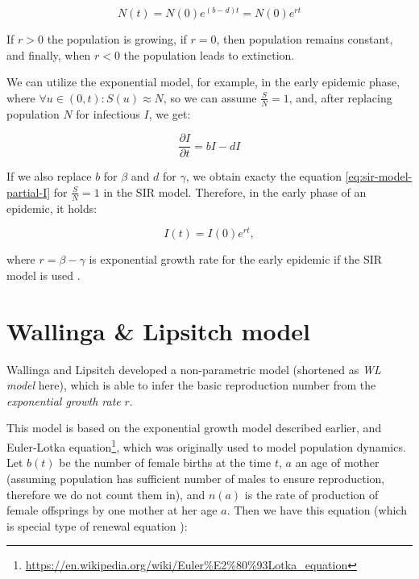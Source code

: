 \documentclass[
  digital, %
  oneside, %
  lof,     %
  lot,     %
]{fithesis4}
\begin{document}
\begin{equation}
  N(t) = N(0) e^{(b - d)t} = N(0) e^{rt}
\end{equation}

If $r > 0$ the population is growing, if $r = 0$, then population remains constant, and finally, when $r < 0$ the population leads to extinction.

We can utilize the exponential model, for example, in the early epidemic phase, where $\forall u \in (0, t) : S(u) \approx N$, so we can assume $\frac{S}{N} = 1$, and, after replacing population $N$ for infectious $I$, we get:

\begin{equation}
  \frac{\partial I}{\partial t} = b I - d I
\end{equation}

If we also replace $b$ for $\beta$ and $d$ for $\gamma$, we
obtain exacty the equation \eqref{eq:sir-model-partial-I} for $\frac{S}{N} = 1$ in the SIR model.
Therefore, in the early phase of an epidemic, it holds:

\begin{equation}
  I(t) = I(0) e^{rt},
\end{equation}

\noindent
where $r = \beta - \gamma$ is exponential growth rate for the early epidemic
if the SIR model is used \cite{ma2019}.



\section{Wallinga \& Lipsitch model}
\label{sec:wl-model}

Wallinga and Lipsitch \cite{wallinga2007} developed a non-parametric
model (shortened as \textit{WL model} here), which is able to infer
the basic reproduction number from the \textit{exponential growth rate} $r$.

This model is based on the exponential growth model described earlier, and
Euler-Lotka equation\footnote{\url{https://en.wikipedia.org/wiki/Euler\%E2\%80\%93Lotka_equation}},
which was originally used to model population dynamics.
Let $b(t)$ be the number of female births at the time $t$, $a$ an 
age of mother (assuming population has sufficient 
number of males to ensure reproduction, therefore we do not 
count them in), and $n(a)$ is the rate of production of female offsprings 
by one mother at her age $a$. Then we have this equation (which is 
special type of renewal equation \cite{feller1941}):
\end{document}
